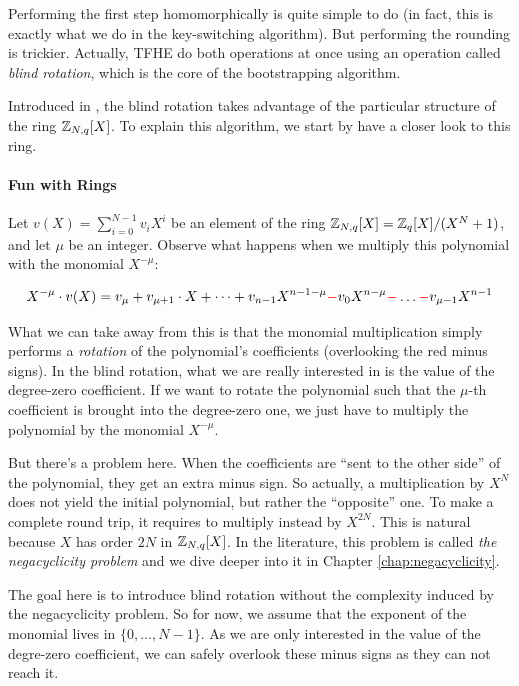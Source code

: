 Performing the first step homomorphically is quite simple to do (in fact, this is exactly what we do in the key-switching algorithm). But performing the rounding is trickier. Actually, TFHE do both operations at once using an operation called \textit{blind rotation}, which is the core of the bootstrapping algorithm. 

Introduced in \cite{EC:DucMic15}, the blind rotation takes advantage of the particular structure of the ring $\mathbb{Z}_{N,q}[X]$. To explain this algorithm, we start by have a closer look to this ring.




\paragraph{Fun with Rings}

Let $v(X) = \displaystyle \sum_{i=0}^{N-1} v_i X^i$ be an element of the ring $\mathbb{Z}_{N,q}[X] = \mathbb{Z}_q[X] / (X^N + 1)$, and let $\mu$ be an integer. Observe what happens when we multiply this polynomial with the monomial $X^{-\mu}$:

\begin{equation*}
	X^{-\mu} \cdot v(X) = v_\mu + v_{\mu + 1} \cdot X + \dots + v_{n-1} X^{n-1-\mu} \textcolor{red}{-} v_0 X^{n - \mu} \textcolor{red}{-} \dots \textcolor{red}{-} v_{\mu - 1} X^{n-1}
\end{equation*}

What we can take away from this is that the monomial multiplication simply performs a \textit{rotation} of the polynomial's coefficients (overlooking the red minus signs). In the blind rotation, what we are really interested in is the value of the degree-zero coefficient. If we want to rotate the polynomial such that the $\mu$-th coefficient is brought into the degree-zero one, we just have to multiply the polynomial by the monomial $X^{-\mu}$.

But there's a problem here. When the coefficients are ``sent to the other side'' of the polynomial, they get an extra minus sign. So actually, a multiplication by $X^N$ does not yield the initial polynomial, but rather the ``opposite'' one. To make a complete round trip, it requires to multiply instead by $X^{2N}$. This is natural because $X$ has order $2N$ in $\mathbb{Z}_{N,q}[X]$. In the literature, this problem is called \textit{the negacyclicity problem} and we dive deeper into it in Chapter \ref{chap:negacyclicity}.

The goal here is to introduce blind rotation without the complexity induced by the negacyclicity problem. So for now, we assume that the exponent of the monomial lives in $\lbrace 0, \dots, N-1 \rbrace$. As we are only interested in the value of the degre-zero coefficient, we can safely overlook these minus signs as they can not reach it.

